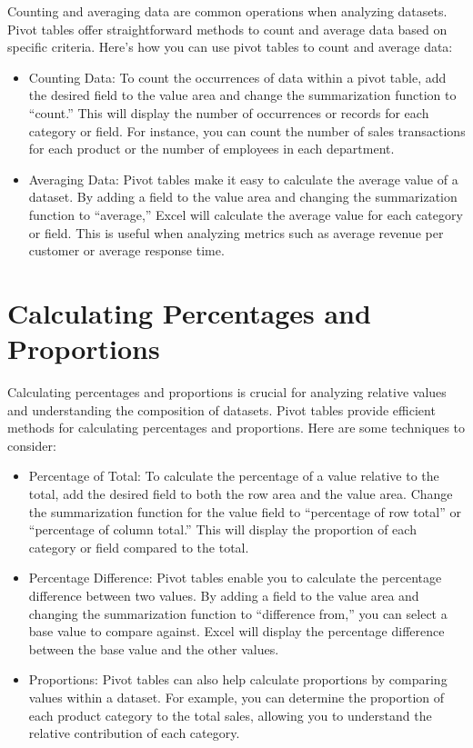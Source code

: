 \documentclass[
]{book}
\begin{document}
Counting and averaging data are common operations when analyzing datasets. Pivot tables offer straightforward methods to count and average data based on specific criteria. Here's how you can use pivot tables to count and average data:

\begin{itemize}
\item
  Counting Data: To count the occurrences of data within a pivot table, add the desired field to the value area and change the summarization function to ``count.'' This will display the number of occurrences or records for each category or field. For instance, you can count the number of sales transactions for each product or the number of employees in each department.
\item
  Averaging Data: Pivot tables make it easy to calculate the average value of a dataset. By adding a field to the value area and changing the summarization function to ``average,'' Excel will calculate the average value for each category or field. This is useful when analyzing metrics such as average revenue per customer or average response time.
\end{itemize}

\hypertarget{calculating-percentages-and-proportions}{%
\section{Calculating Percentages and Proportions}\label{calculating-percentages-and-proportions}}

Calculating percentages and proportions is crucial for analyzing relative values and understanding the composition of datasets. Pivot tables provide efficient methods for calculating percentages and proportions. Here are some techniques to consider:

\begin{itemize}
\item
  Percentage of Total: To calculate the percentage of a value relative to the total, add the desired field to both the row area and the value area. Change the summarization function for the value field to ``percentage of row total'' or ``percentage of column total.'' This will display the proportion of each category or field compared to the total.
\item
  Percentage Difference: Pivot tables enable you to calculate the percentage difference between two values. By adding a field to the value area and changing the summarization function to ``difference from,'' you can select a base value to compare against. Excel will display the percentage difference between the base value and the other values.
\item
  Proportions: Pivot tables can also help calculate proportions by comparing values within a dataset. For example, you can determine the proportion of each product category to the total sales, allowing you to understand the relative contribution of each category.
\end{itemize}
\end{document}
